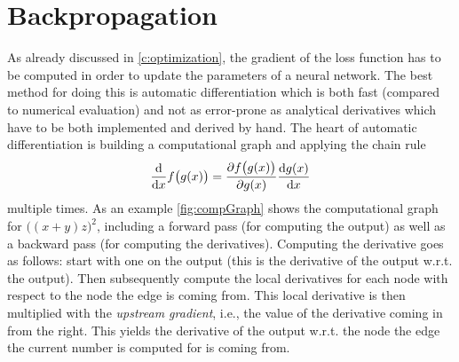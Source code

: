 \chapter{Backpropagation}
	\label{c:backpropagation}

	As already discussed in \autoref{c:optimization}, the gradient of the loss function has to be computed in order to update the parameters of a neural network. The best method for doing this is automatic differentiation which is both fast (compared to numerical evaluation) and not as error-prone as analytical derivatives which have to be both implemented and derived by hand. The heart of automatic differentiation is building a computational graph and applying the chain rule
	\begin{equation}
		\dv{x} f\bigl( g(x) \bigr) = \pdv{f\bigl( g(x) \bigr)}{g(x)} \dv{g(x)}{x}
	\end{equation}
	multiple times. As an example \autoref{fig:compGraph} shows the computational graph for \( \bigl( (x + y) z \bigr)^2 \), including a forward pass (for computing the output) as well as a backward pass (for computing the derivatives). Computing the derivative goes as follows: start with one on the output (this is the derivative of the output w.r.t. the output). Then subsequently compute the local derivatives for each node with respect to the node the edge is coming from. This local derivative is then multiplied with the \emph{upstream gradient}, i.e., the value of the derivative coming in from the right. This yields the derivative of the output w.r.t. the node the edge the current number is computed for is coming from.

